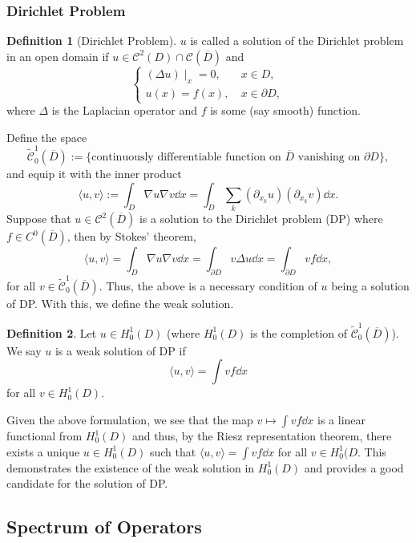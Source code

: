 \documentclass[]{article}
\theoremstyle{definition}
\theoremstyle{definition}
\newtheorem{definition}{Definition}[section]
\begin{document}
\subsubsection{Dirichlet Problem}

\begin{definition}[Dirichlet Problem]
  \(u\) is called a solution of the Dirichlet problem in an open domain if 
  \(u \in \mathcal{C}^2(D) \cap \mathcal{C}(\overline{D})\) and 
  \[\begin{cases}
    (\Delta u)\mid_x = 0, \ & x \in D,\\
    u(x) = f(x), \ & x \in \partial D,
  \end{cases}\]
  where \(\Delta\) is the Laplacian operator and \(f\) is some (say smooth) 
  function.
\end{definition}

Define the space 
\[\tilde{\mathcal{C}}_0^1(\overline{D}) := \{\text{continuously differentiable 
function on \(\overline{D}\) vanishing on \(\partial D\)}\},\]
and equip it with the inner product 
\[\langle u, v \rangle := \int_D \nabla u \nabla v \dd x = 
  \int_D \sum_k (\partial_{x_k} u)(\partial_{x_k} v) \dd x.\]
Suppose that \(u \in \mathcal{C}^2(\overline{D})\) is a solution 
to the Dirichlet problem (DP) where \(f \in C^0(\overline{D})\), then by 
Stokes' theorem, 
\[\langle u, v \rangle = \int_D \nabla u \nabla v \dd x = 
  \int_{\partial D} v \Delta u \dd x = \int_{\partial D} v f \dd x,\]
for all \(v \in \tilde{\mathcal{C}}_0^1(\overline{D})\). 
Thus, the above is a necessary condition of \(u\) being a solution of 
DP. With this, we define the weak solution.

\begin{definition}
  Let \(u \in H^1_0(D)\) (where \(H^1_0(D)\) is the completion of 
  \(\tilde{\mathcal{C}}_0^1(\overline{D})\)). We say \(u\) is a weak 
  solution of DP if 
  \[\langle u, v\rangle = \int vf \dd x\]
  for all \(v \in H^1_0(D)\).
\end{definition}

Given the above formulation, we see that the map \(v \mapsto \int vf \dd x\) 
is a linear functional from \(H_0^1(D)\) and thus, by the Riesz representation 
theorem, there exists a unique \(u \in H_0^1(D)\) such that 
\(\langle u, v \rangle = \int v f \dd x\) for all \(v \in H_0^1(D\). This 
demonstrates the existence of the weak solution in \(H_0^1(D)\) and provides 
a good candidate for the solution of DP.

\subsection{Spectrum of Operators}
\end{document}
